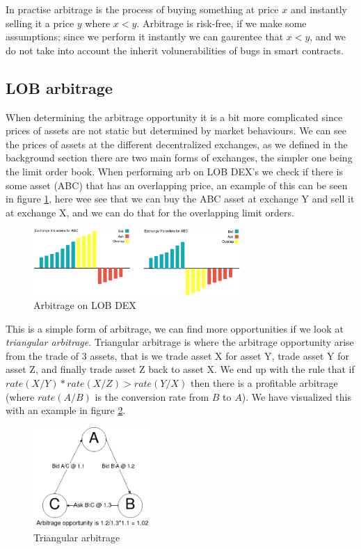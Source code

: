 In practise arbitrage is the process of buying something at price $x$ and instantly selling it a price $y$ where $x<y$. Arbitrage is risk-free, if we make some assumptions; since we perform it instantly we can gaurentee that $x<y$, and we do not take into account the inherit volunerabilities of bugs in smart contracts.

\subsection{LOB arbitrage}

When determining the arbitrage opportunity it is a bit more complicated since prices of assets are not static but determined by market behaviours. We can see the prices of assets at the different decentralized exchanges, as we defined in the background section there are two main forms of exchanges, the simpler one being the limit order book. When performing arb on LOB DEX's we check if there is some asset (ABC) that has an overlapping price, an example of this can be seen in figure \ref{fig:ArbLOB}, here wee see that we can buy the ABC asset at exchange Y and sell it at exchange X, and we can do that for the overlapping limit orders.
\begin{figure}[h]
\centering
\includegraphics[width=0.7\textwidth]{assests/Flash-loans-Arbitrage-Overlap-1}
\caption{Arbitrage on LOB DEX}
\label{fig:ArbLOB}
\end{figure}
This is a simple form of arbitrage, we can find more opportunities if we look at \textit{triangular arbitrage}. Triangular arbitrage is where the arbitrage opportunity arise from the trade of 3 assets, that is we trade asset X for asset Y, trade asset Y for asset Z, and finally trade asset Z back to asset X. We end up with the rule that if $rate(X/Y)*rate(X/Z)>rate(Y/X)$ then there is a profitable arbitrage (where $rate(A/B)$ is the conversion rate from $B$ to $A$). We have visualized this with an example in figure \ref{fig:ArbTrig}.
\begin{figure}[h]
\centering
\includegraphics[width=0.4\textwidth]{assests/Flash-loans-Arbitrage-triangular}
\caption{Triangular arbitrage}
\label{fig:ArbTrig}
\end{figure}

